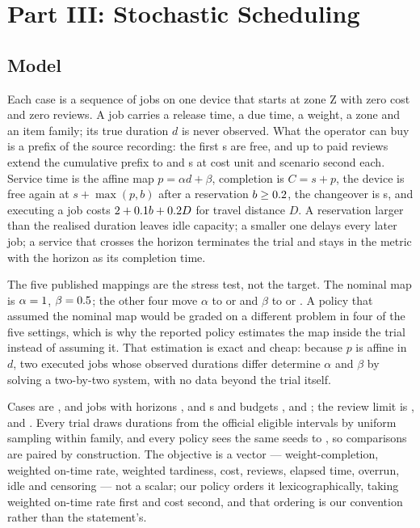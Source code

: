 \documentclass{swmcmthesis}
\begin{document}
\section{Part III: Stochastic Scheduling}
\label{sec:partthree}

\subsection{Model}
\label{sec:p3model}

Each case is a sequence of jobs on one device that starts at zone
Z\slotZoneZero{} with zero cost and zero reviews. A job carries a release time, a
due time, a weight, a zone and an item family; its true duration $d$ is never
observed. What the operator can buy is a prefix of the source recording: the first
\slotPrefixFree{} s are free, and up to \slotMaxReviewsPerJob{} paid reviews extend
the cumulative prefix to \slotPrefixMid{} and \slotPrefixLong{} s at
\slotReviewCost{} cost unit and \slotReviewDelay{} scenario second each. Service time
is the affine map $p=\alpha d+\beta$, completion is $C=s+p$, the device is free again
at $s+\max(p,b)$ after a reservation $b\ge0.2$, the changeover is
\slotChangeOver{} s, and executing a job costs $2{}+0.1 b+0.2 D$
for travel distance $D$. A reservation larger than the realised duration leaves idle
capacity; a smaller one delays every later job; a service that crosses the horizon
terminates the trial and stays in the metric with the horizon as its completion time.

The five published mappings are the stress test, not the target. The nominal map is
$\alpha=1$, $\beta=0.5$; the other four move $\alpha$ to
\slotAlphaLow{} or \slotAlphaHigh{} and $\beta$ to \slotBetaLow{} or \slotBetaHigh{}.
A policy that assumed the nominal map would be graded on a different problem in four
of the five settings, which is why the reported policy estimates the map inside the
trial instead of assuming it. That estimation is exact and cheap: because $p$ is
affine in $d$, two executed jobs whose observed durations differ determine $\alpha$
and $\beta$ by solving a two-by-two system, with no data beyond the trial itself.

Cases are \slotJobsSOne{}, \slotJobsSTwo{} and \slotJobsSThree{} jobs with horizons
\slotHSOne{}, \slotHSTwo{} and \slotHSThree{} s and budgets \slotBudgetSOne{},
\slotBudgetSTwo{} and \slotBudgetSThree{}; the review limit is \slotKSOne{},
\slotKSTwo{} and \slotKSThree{}. Every trial draws durations from the official
eligible intervals by uniform sampling within family, and every policy sees the same
\slotNSeeds{} seeds \slotSeedStart{} to \slotSeedEnd{}, so comparisons are paired by
construction. The objective is a vector --- weight-completion, weighted on-time
rate, weighted tardiness, cost, reviews, elapsed time, overrun, idle and censoring
--- not a scalar; our policy orders it lexicographically, taking weighted on-time
rate first and cost second, and that ordering is our convention rather than the
statement's.
\end{document}
